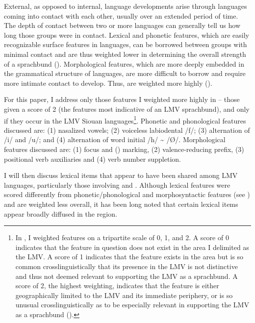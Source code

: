 \documentclass[output=paper]{LSP/langsci}
\begin{document}
External, as opposed to internal, language developments arise through languages coming into contact with each other, usually over an extended period of time. The depth of contact between two or more languages can generally tell us how long those groups were in contact. Lexical and phonetic features, which are easily recognizable surface features in languages, can be borrowed between groups with minimal contact and are thus weighted lower in determining the overall strength of a sprachbund (\citealt{Kaufman2014}). Morphological features, which are more deeply embedded in the grammatical structure of languages, are more difficult to borrow and require more intimate contact to develop. Thus,  are weighted more highly (\citealt{Kaufman2014}).

For this paper, I address only those features I weighted more highly in \citet{Kaufman2014} -- those given a score of 2 (the features most indicative of an LMV sprachbund), and only if they occur in the LMV Siouan languages\footnote{In \citet{Kaufman2014}, I weighted features on a tripartite scale of 0, 1, and 2. A score of 0 indicates that the feature in question does not exist in the area I delimited as the LMV. A score of 1 indicates that the feature exists in the area but is so common crosslinguistically that its presence in the LMV is not distinctive and thus not deemed relevant to supporting the LMV as a sprachbund. A score of 2, the highest weighting, indicates that the feature is either geographically limited to the LMV and its immediate periphery, or is so unusual crosslinguistically as to be especially relevant in supporting the LMV as a sprachbund (\citealt{Kaufman2014}).}. Phonetic and phonological features discussed are: (1) nasalized vowels; (2) voiceless labiodental  /f/; (3) alternation of /i/ and /u/; and (4) alternation of word initial /h/ \textasciitilde{} /Ø/. Morphological features discussed are: (1) focus and  () marking, (2) valence-reducing prefix, (3) positional verb auxiliaries and (4) verb number suppletion. 

I will then discuss lexical items that appear to have been shared among LMV languages, particularly those involving  and . Although lexical features were scored differently from phonetic/phonological and morphosyntactic features (see \citealt{Kaufman2014}) and are weighted less overall, it has been long noted that certain lexical items appear broadly diffused in the region. 
\end{document}
